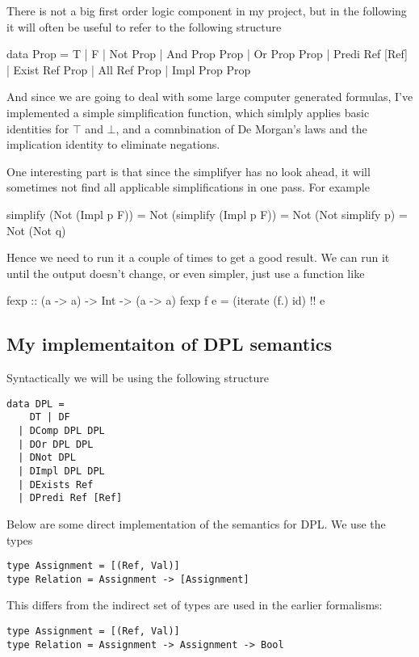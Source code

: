\documentclass[12pt]{article}
\begin{document}
There is not a big first order logic component in my project, but in the following it will often be useful to refer to the following structure

\begin{haskell}
data Prop =
    T | F
  | Not   Prop
  | And   Prop Prop
  | Or    Prop Prop
  | Predi Ref [Ref]
  | Exist Ref Prop
  | All Ref Prop
  | Impl Prop Prop
\end{haskell}

And since we are going to deal with some large computer generated formulas, I've implemented a simple simplification function, which simlply applies basic identities for $\top$ and $\bot$, and a comnbination of De Morgan's laws and the implication identity to eliminate negations.

One interesting part is that since the simplifyer has no look ahead, it will sometimes not find all applicable simplifications in one pass. For example
%
\begin{haskell}
simplify (Not (Impl p F)) = Not (simplify (Impl p F))
                          = Not (Not simplify p)
                          = Not (Not q)
\end{haskell}
%
Hence we need to run it a couple of times to get a good result. We can run it until the output doesn't change, or even simpler, just use a function like
%
\begin{haskell}
fexp :: (a -> a) -> Int -> (a -> a)
fexp f e = (iterate (f.) id) !! e
\end{haskell}

\subsection{My implementaiton of DPL semantics}

Syntactically we will be using the following structure

\begin{lstlisting}
data DPL =
    DT | DF
  | DComp DPL DPL
  | DOr DPL DPL
  | DNot DPL
  | DImpl DPL DPL
  | DExists Ref
  | DPredi Ref [Ref]
\end{lstlisting}

Below are some direct implementation of the semantics for DPL. We use the types
\begin{lstlisting}
type Assignment = [(Ref, Val)]
type Relation = Assignment -> [Assignment]
\end{lstlisting}
This differs from the indirect set of types are used in the earlier formalisms:
\begin{lstlisting}
type Assignment = [(Ref, Val)]
type Relation = Assignment -> Assignment -> Bool
\end{lstlisting}
\end{document}
